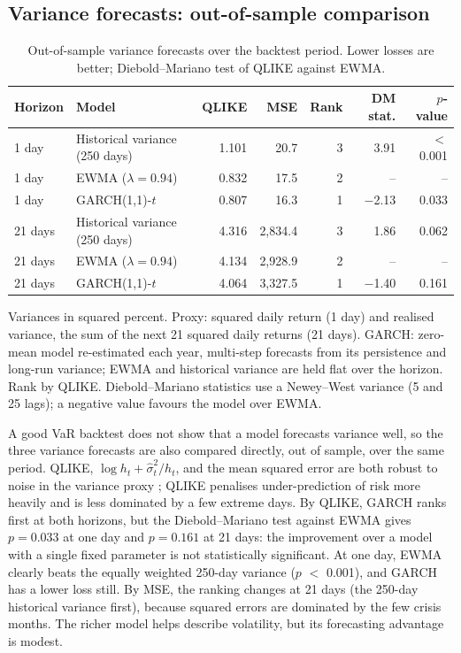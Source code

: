 \documentclass[11pt,a4paper]{article}
\newcommand{\keep}[1]{\Needspace{#1\baselineskip}}
\newcommand{\note}[1]{{\footnotesize\color{muted}#1\par}}
\begin{document}
\keep{16}\subsection{Variance forecasts: out-of-sample comparison}
\begin{table}[H]
\small
\caption{Out-of-sample variance forecasts over the backtest period. Lower losses are better; Diebold--Mariano test of QLIKE against EWMA.}
\begin{tabularx}{\linewidth}{l L r r r r r}
\toprule
\textbf{Horizon} & \textbf{Model} & \textbf{QLIKE} & \textbf{MSE} & \textbf{Rank} & \textbf{DM stat.} & \textbf{$p$-value} \\
 day & Historical variance (250 days) & 1.101 & 20.7 & 3 & 3.91 & $<$ 0.001 \\
1 day & EWMA ($\lambda = 0.94$) & 0.832 & 17.5 & 2 & -- & -- \\
1 day & GARCH(1,1)-$t$ & 0.807 & 16.3 & 1 & $-$2.13 & 0.033 \\
\midrule{}21 days & Historical variance (250 days) & 4.316 & 2,834.4 & 3 & 1.86 & 0.062 \\
21 days & EWMA ($\lambda = 0.94$) & 4.134 & 2,928.9 & 2 & -- & -- \\
21 days & GARCH(1,1)-$t$ & 4.064 & 3,327.5 & 1 & $-$1.40 & 0.161 \\
\bottomrule
\end{tabularx}
\end{table}
\note{Variances in squared percent. Proxy: squared daily return (1 day) and realised variance, the sum of the next 21 squared daily returns (21 days). GARCH: zero-mean model re-estimated each year, multi-step forecasts from its persistence and long-run variance; EWMA and historical variance are held flat over the horizon. Rank by QLIKE. Diebold--Mariano statistics use a Newey--West variance (5 and 25 lags); a negative value favours the model over EWMA.}

A good VaR backtest does not show that a model forecasts variance well, so the three variance forecasts are also compared directly, out of sample, over the same period. QLIKE, $\log h_t + \hat\sigma_t^2/h_t$, and the mean squared error are both robust to noise in the variance proxy \citep{patton2011}; QLIKE penalises under-prediction of risk more heavily and is less dominated by a few extreme days. By QLIKE, GARCH ranks first at both horizons, but the Diebold--Mariano test \citep{diebold1995} against EWMA gives $p = 0.033$ at one day and $p = 0.161$ at 21 days: the improvement over a model with a single fixed parameter is not statistically significant. At one day, EWMA clearly beats the equally weighted 250-day variance ($p$ $<$ 0.001), and GARCH has a lower loss still. By MSE, the ranking changes at 21 days (the 250-day historical variance first), because squared errors are dominated by the few crisis months. The richer model helps describe volatility, but its forecasting advantage is modest.
\end{document}
